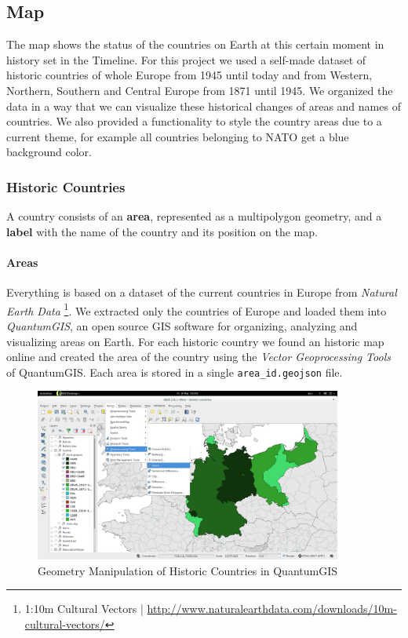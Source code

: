 \subsection{Map} %
\label{sub:map}

The map shows the status of the countries on Earth at this certain moment in history set in the Timeline. For this project we used a self-made dataset of historic countries of whole Europe from 1945 until today and from Western, Northern, Southern and Central Europe from 1871 until 1945. We organized the data in a way that we can visualize these historical changes of areas and names of countries. We also provided a functionality to style the country areas due to a current theme, for example all countries belonging to NATO get a blue background color.

\subsubsection{Historic Countries} %
\label{ssub:historic_countries}

A country consists of an \textbf{area}, represented as a multipolygon geometry, and a \textbf{label} with the name of the country and its position on the map.

\paragraph{Areas}
Everything is based on a dataset of the current countries in Europe from \textit{Natural Earth Data}
\footnote{1:10m Cultural Vectors | \url{http://www.naturalearthdata.com/downloads/10m-cultural-vectors/}}.
We extracted only the countries of Europe and loaded them into \textit{QuantumGIS}, an open source GIS software for organizing, analyzing and visualizing areas on Earth. For each historic country we found an historic map online and created the area of the country using the \textit{Vector Geoprocessing Tools} of QuantumGIS. Each area is stored in a single \texttt{area\_id.geojson} file.

\begin{figure}[H]
  \begin{center}
    \includegraphics[width=0.9\textwidth]{graphics/qgis.png}
  \end{center}
  \caption{Geometry Manipulation of Historic Countries in QuantumGIS}
  \label{fig:qgis}
\end{figure}
\label{par:area}

